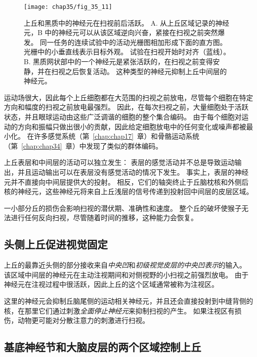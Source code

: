 \begin{figure}[htbp]
	\centering
	\texttt{[image: chap35/fig\_35\_11]}
	\caption{上丘和黑质中的神经元在扫视前后活跃\cite{hikosaka1989functional}。
		A. 从上丘区域记录的神经元，B 中的神经元可以从该区域逆向兴奋，紧接在扫视之前突然爆发。
		同一任务的连续试验中的活动光栅图相加形成下面的直方图。
		光栅中的小垂直线表示目标外观。
		试验在扫视开始时对齐（蓝线）。
		B. 黑质网状部中的一个神经元是紧张活跃的，在扫视之前变得安静，并在扫视之后恢复活动。
		这种类型的神经元抑制上丘中间层的神经元。}
	\label{fig:35_11}
\end{figure}


运动场很大，因此每个上丘细胞都在大范围的扫视之前放电，尽管每个细胞在特定方向和幅度的扫视之前放电最强烈。
因此，在每次扫视之前，大量细胞处于活跃状态，并且眼球运动由这些广泛调谐的细胞的整个集合编码。
由于每个细胞对运动的方向和振幅只做出很小的贡献，因此给定细胞放电中的任何变化或噪声都被最小化。
在许多感觉系统（第~\ref{chap:chap17}~章）和骨骼运动系统（第~\ref{chap:chap34}~章）中发现了类似的群体编码。


上丘表层和中间层的活动可以独立发生：
表层的感觉活动并不总是导致运动输出，并且运动输出可以在表层没有感觉活动的情况下发生。
事实上，表层的神经元并不直接向中间层提供大的投射。
相反，它们的轴突终止于丘脑枕核和外侧后核的神经元，这些神经元将来自上丘浅层的信号传递到投射回中间层的皮层区域。


一小部分丘的损伤会影响扫视的潜伏期、准确性和速度。
整个丘的破坏使猴子无法进行任何反向扫视，尽管随着时间的推移，这种能力会恢复。



\subsection{头侧上丘促进视觉固定}

上丘的最靠近头侧的部分接收来自\textit{中央凹}和\textit{初级视觉皮层的中央凹表示}的输入。
该区域中间层的神经元在主动注视期间和对侧视野的小扫视之前强烈放电。
由于神经元在注视过程中很活跃，因此上丘的这个区域通常被称为注视区。


这里的神经元会抑制丘脑尾侧的运动相关神经元，并且还会直接投射到中缝背侧的核，在那里它们通过刺激\textit{全面停止神经元}来抑制扫视的产生。
如果注视区有损伤，动物更可能对分散注意力的刺激进行扫视。


\subsection{基底神经节和大脑皮层的两个区域控制上丘}

